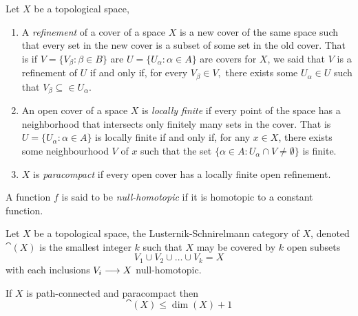 \begin{defn}
    Let $X$ be a topological space,
    \begin{enumerate}
        \item A \textit{refinement} of a cover of a space $X$ is a new cover of the same space such that every set in the new cover is a subset of some set in the old cover. That is if $V = \{V_\beta : \beta \in B\}$ are $U = \{U_\alpha : \alpha \in A\}$ are covers for $X$, we said that $V$ is a refinement of $U$ if and only if, for every $V_\beta \in V,$ there exists some $U_\alpha \in U$ such that $V_\beta \subseteq \in U_\alpha$.
        \item An open cover of a space $X$ is \textit{locally finite} if every point of the space has a neighborhood that intersects only finitely many sets in the cover. That is $U = \{U_\alpha : \alpha \in A\}$ is locally finite if and only if, for any $x \in X$, there exists some neighbourhood $V$ of $x$ such that the set $\{\alpha \in A : U_\alpha \cap V \neq \emptyset\}$ is finite.
        \item $X$ is \textit{paracompact} if every open cover has a locally finite open refinement.
    \end{enumerate}
\end{defn}

\begin{defn}
    A function $f$ is said to be \textit{null-homotopic} if it is homotopic to a constant function.
\end{defn}

\begin{defn}
    Let $X$ be a topological space, the Lusternik-Schnirelmann category of $X$, denoted $\cat(X)$ is the smallest integer $k$ such that $X$ may be covered by $k$ open subsets
    \[
        V_1 \cup V_2 \cup \ldots \cup V_k = X
    \]
    with each inclusions $V_i \longrightarrow X$ null-homotopic.
\end{defn}

\begin{prop}\cite{james1978category}\label{james:1}
    If $X$ is path-connected and paracompact then
    \[
        \cat(X) \le \dim(X) + 1
    \]
\end{prop}


